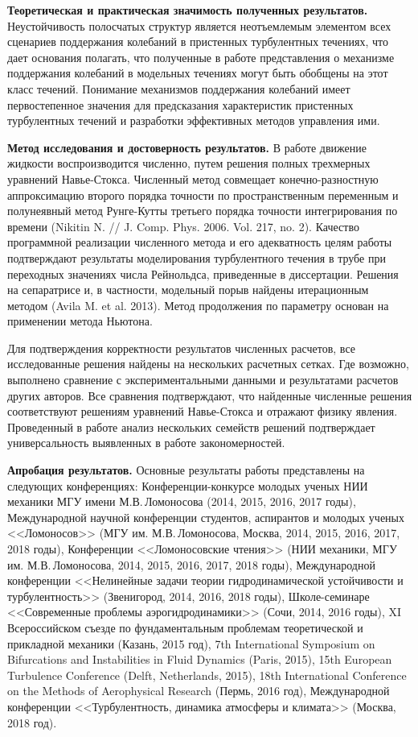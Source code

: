 {\bf Теоретическая и практическая значимость полученных результатов.}
Неустойчивость полосчатых структур является неотъемлемым элементом всех сценариев поддержания колебаний в пристенных турбулентных течениях, что дает основания полагать, что полученные в работе представления о механизме поддержания колебаний в модельных течениях могут быть обобщены на этот класс течений. Понимание механизмов поддержания колебаний имеет первостепенное значения для предсказания характеристик пристенных турбулентных течений и разработки эффективных методов управления ими.

\textbf{Метод исследования и достоверность результатов.}
В работе движение жидкости воспроизводится численно, путем решения полных трехмерных уравнений Навье-Стокса. Численный метод совмещает конечно-разностную аппроксимацию второго порядка точности по пространственным переменным и полунеявный метод Рунге-Кутты третьего порядка точности интегрирования по времени (Nikitin N. // J. Comp. Phys. 2006. Vol. 217, no. 2). Качество программной реализации численного метода и его адекватность целям работы подтверждают результаты моделирования турбулентного течения в трубе при переходных значениях числа Рейнольдса, приведенные в диссертации. Решения на сепаратрисе и, в частности, модельный порыв найдены итерационным методом (Avila M. et al. 2013). Метод продолжения по параметру основан на применении метода Ньютона.

Для подтверждения корректности результатов численных расчетов, все исследованные решения найдены на нескольких расчетных сетках. Где возможно, выполнено сравнение с экспериментальными данными и результатами расчетов других авторов. Все сравнения подтверждают, что найденные численные решения соответствуют решениям уравнений Навье-Стокса и отражают физику явления. Проведенный в работе анализ нескольких семейств решений подтверждает универсальность выявленных в работе закономерностей.

{\bf Апробация результатов.} Основные результаты работы представлены на следующих конференциях: 
Конференции-конкурсе молодых ученых НИИ механики МГУ имени М.В.\,Ломоносова (2014, 2015, 2016, 2017 годы),
Международной научной конференции студентов, аспирантов и молодых ученых <<Ломоносов>> (МГУ им. М.В.\,Ломоносова, Москва, 2014, 2015, 2016, 2017, 2018 годы), 
Конференции <<Ломоносовские чтения>> (НИИ механики, МГУ им. М.В.\,Ломоносова, 2014, 2015, 2016, 2017, 2018 годы),
Международной конференции <<Нелинейные задачи теории гидродинамической устойчивости и турбулентность>> (Звенигород, 2014, 2016, 2018 годы),
Школе-семинаре <<Современные проблемы аэрогидродинамики>> (Сочи, 2014, 2016 годы),
XI Всероссийском съезде по фундаментальным проблемам теоретической и прикладной механики (Казань, 2015 год),
7th International Symposium on Bifurcations and Instabilities in Fluid Dynamics (Paris, 2015),
15th European Turbulence Conference (Delft, Netherlands, 2015),
18th International Conference on the Methods of Aerophysical Research (Пермь, 2016 год),
Международной конференции <<Турбулентность, динамика атмосферы и климата>> (Москва, 2018 год).

